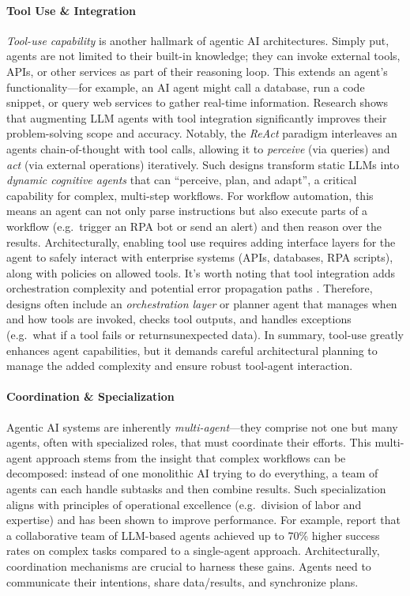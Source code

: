 \paragraph{Tool Use \& Integration} \emph{Tool-use capability} is another hallmark of agentic AI architectures. Simply put, agents are not limited to their built-in knowledge; they can invoke external tools, APIs, or other services as part of their reasoning loop. This extends an agent's functionality---for example, an AI agent might call a database, run a code snippet, or query web services to gather real-time information. Research shows that augmenting LLM agents with tool integration significantly improves their problem-solving scope and accuracy. Notably, the \emph{ReAct} paradigm interleaves an agents chain-of-thought with tool calls, allowing it to \emph{perceive} (via queries) and \emph{act} (via external operations) iteratively. Such designs transform static LLMs into \emph{dynamic cognitive agents} that can “perceive, plan, and adapt”, a critical capability for complex, multi-step workflows. For workflow automation, this means an agent can not only parse instructions but also execute parts of a workflow (e.g.~trigger an RPA bot or send an alert) and then reason over the results. Architecturally, enabling tool use requires adding interface layers for the agent to safely interact with enterprise systems (APIs, databases, RPA scripts), along with policies on allowed tools. It's worth noting that tool integration adds orchestration complexity and potential error propagation paths \parencite{sapkotaAI2026}. Therefore, designs often include an \emph{orchestration layer} or planner agent that manages when and how tools are invoked, checks tool outputs, and handles exceptions (e.g.~what if a tool fails or returnsunexpected data). In summary, tool-use greatly enhances agent capabilities, but it demands careful architectural planning to manage the added complexity and ensure robust tool-agent interaction. 

\paragraph{Coordination \& Specialization} Agentic AI systems are inherently \emph{multi-agent}---they comprise not one but many agents, often with specialized roles, that must coordinate their efforts. This multi-agent approach stems from the insight that complex workflows can be decomposed: instead of one monolithic AI trying to do everything, a team of agents can each handle subtasks and then combine results. Such specialization aligns with principles of operational excellence (e.g.~division of labor and expertise) and has been shown to improve performance. For example, \textcite{shuEffective2024} report that a collaborative team of LLM-based agents achieved up to 70\% higher success rates on complex tasks compared to a single-agent approach. Architecturally, coordination mechanisms are crucial to harness these gains. Agents need to communicate their intentions, share data/results, and synchronize plans.

